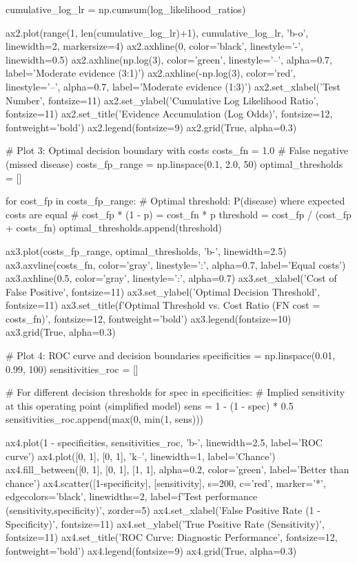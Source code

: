 \documentclass[a4paper, 11pt]{article}
\begin{document}
{{\begin{pycode}
cumulative_log_lr = np.cumsum(log_likelihood_ratios)

ax2.plot(range(1, len(cumulative_log_lr)+1), cumulative_log_lr, 'b-o', linewidth=2, markersize=4)
ax2.axhline(0, color='black', linestyle='-', linewidth=0.5)
ax2.axhline(np.log(3), color='green', linestyle='--', alpha=0.7, label='Moderate evidence (3:1)')
ax2.axhline(-np.log(3), color='red', linestyle='--', alpha=0.7, label='Moderate evidence (1:3)')
ax2.set_xlabel('Test Number', fontsize=11)
ax2.set_ylabel('Cumulative Log Likelihood Ratio', fontsize=11)
ax2.set_title('Evidence Accumulation (Log Odds)', fontsize=12, fontweight='bold')
ax2.legend(fontsize=9)
ax2.grid(True, alpha=0.3)

# Plot 3: Optimal decision boundary with costs
costs_fn = 1.0  # False negative (missed disease)
costs_fp_range = np.linspace(0.1, 2.0, 50)
optimal_thresholds = []

for cost_fp in costs_fp_range:
    # Optimal threshold: P(disease) where expected costs are equal
    # cost_fp * (1 - p) = cost_fn * p
    threshold = cost_fp / (cost_fp + costs_fn)
    optimal_thresholds.append(threshold)

ax3.plot(costs_fp_range, optimal_thresholds, 'b-', linewidth=2.5)
ax3.axvline(costs_fn, color='gray', linestyle=':', alpha=0.7, label='Equal costs')
ax3.axhline(0.5, color='gray', linestyle=':', alpha=0.7)
ax3.set_xlabel('Cost of False Positive', fontsize=11)
ax3.set_ylabel('Optimal Decision Threshold', fontsize=11)
ax3.set_title(f'Optimal Threshold vs. Cost Ratio (FN cost = {costs_fn})', fontsize=12, fontweight='bold')
ax3.legend(fontsize=10)
ax3.grid(True, alpha=0.3)

# Plot 4: ROC curve and decision boundaries
specificities = np.linspace(0.01, 0.99, 100)
sensitivities_roc = []

# For different decision thresholds
for spec in specificities:
    # Implied sensitivity at this operating point (simplified model)
    sens = 1 - (1 - spec) * 0.5
    sensitivities_roc.append(max(0, min(1, sens)))

ax4.plot(1 - specificities, sensitivities_roc, 'b-', linewidth=2.5, label='ROC curve')
ax4.plot([0, 1], [0, 1], 'k--', linewidth=1, label='Chance')
ax4.fill_between([0, 1], [0, 1], [1, 1], alpha=0.2, color='green', label='Better than chance')
ax4.scatter([1-specificity], [sensitivity], s=200, c='red', marker='*',
            edgecolors='black', linewidths=2, label=f'Test performance ({sensitivity},{specificity})', zorder=5)
ax4.set_xlabel('False Positive Rate (1 - Specificity)', fontsize=11)
ax4.set_ylabel('True Positive Rate (Sensitivity)', fontsize=11)
ax4.set_title('ROC Curve: Diagnostic Performance', fontsize=12, fontweight='bold')
ax4.legend(fontsize=9)
ax4.grid(True, alpha=0.3)


\end{pycode}}}
\end{document}
